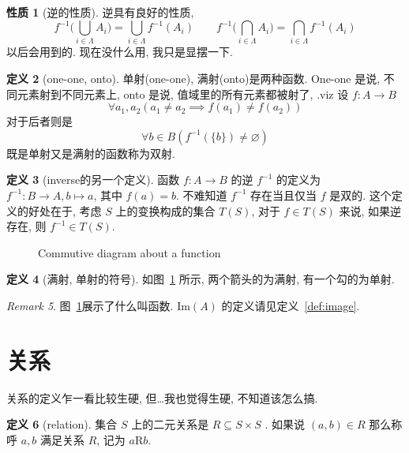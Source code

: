 \documentclass[10pt]{ctexart}
\theoremstyle{definition}
\theoremstyle{definition}
\newtheorem{definition}{定义}[section]
\newtheorem{proposition}[definition]{性质}
\theoremstyle{plain}
\theoremstyle{remark}
\newtheorem{remark}[definition]{Remark}
\begin{document}
\begin{proposition}[逆的性质]
逆具有良好的性质, 
\begin{equation}
		f^{-1} \Big(\bigcup_{i \in \Lambda}A_{i}\Big) = \bigcup_{i \in \Lambda} f^{-1} (A_{i}) \qquad
		f^{-1} \Big(\bigcap_{i \in \Lambda}A_{i}\Big) = \bigcap_{i \in \Lambda} f^{-1} (A_{i})
\end{equation}
以后会用到的. 现在没什么用, 我只是显摆一下.
\end{proposition}
\begin{definition}[one-one, onto]
单射(one-one), 满射(onto)是两种函数. One-one 是说, 不同元素射到不同元素上, onto 是说, 值域里的所有元素都被射了, .viz
设 \(f \colon A \to B\) 
\begin{equation}
	\forall a_{1} , a_{2} ( a_{1} \ne a_{2} \implies f (a_{1} ) \ne f (a_{2}) )
\end{equation}
对于后者则是
\begin{equation}
	\forall b \in B ( f^{-1} ( \{ b\} ) \ne \varnothing )
\end{equation}
既是单射又是满射的函数称为双射. 
\end{definition}
\begin{definition}[inverse的另一个定义]
	函数 \(f \colon A \to B \) 的逆 \(f ^{-1} \) 的定义为 \(f ^{-1} \colon B \to A , b \mapsto a\), 其中 \(f (a) = b\). 不难知道 \(f ^{-1}\) 存在当且仅当 \(f\) 是双的. 
	这个定义的好处在于, 考虑 \(S\) 上的变换构成的集合 \(T(S)\), 对于 \(f \in T (S)\) 来说, 如果逆存在, 则 \(f ^{-1} \in T (S)\). 
\end{definition}


\begin{figure}
\centering
{}
\caption{Commutive diagram about a function}\label{fig:func}
\end{figure}
\begin{definition}[满射, 单射的符号]
	如图~\ref{fig:func} 所示, 两个箭头的为满射, 有一个勾的为单射. 
\end{definition}
\begin{remark}
	图~\ref{fig:func}展示了什么叫函数. \(\mathrm{Im} (A)\) 的定义请见定义~\ref{def:image}.
\end{remark}

\section{关系}\label{sec:relation}
关系的定义乍一看比较生硬, 但\dots 我也觉得生硬, 不知道该怎么搞. 
\begin{definition}[relation]
	集合 \(S\) 上的二元关系是 \(R \subseteq S \times S \) . 如果说 \( (a , b) \in R\) 那么称呼 \(a, b \) 满足关系 \(R\), 记为 \(a \mathrm{R} b\). 
\end{definition}
\end{document}
